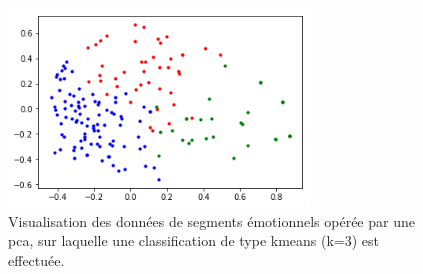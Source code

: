 \begin{figure}[h]
  \centering
  \includegraphics[width=8cm]{./Chapitre7/figures/datakmeans.png}
  \caption{Visualisation des données de segments émotionnels opérée par une pca, sur laquelle une classification de type kmeans (k=3) est effectuée.}
  \label{fig:kmeans}
\end{figure}
